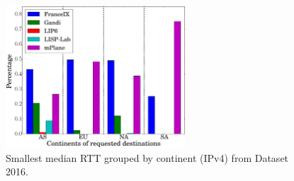\begin{figure}[!t]
	\centering
	\includegraphics[width=0.6\textwidth]{Pics/v4/Smallest_median_avg(RTT)_proporation.eps}
	\caption{Smallest median RTT grouped by continent (IPv4) from Dataset 2016.}
	\label{Smallest_median_avg(RTT)_proporation_v4_2016}
\end{figure}

